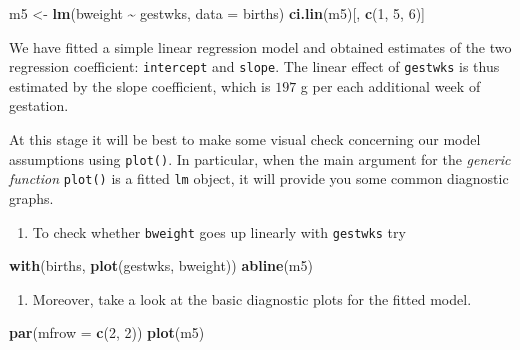 \documentclass[
]{book}
\newenvironment{Shaded}{\begin{snugshade}}{\end{snugshade}}
\newcommand{\AttributeTok}[1]{\textcolor[rgb]{0.13,0.29,0.53}{#1}}
\newcommand{\DecValTok}[1]{\textcolor[rgb]{0.00,0.00,0.81}{#1}}
\newcommand{\FunctionTok}[1]{\textcolor[rgb]{0.13,0.29,0.53}{\textbf{#1}}}
\newcommand{\NormalTok}[1]{#1}
\newcommand{\OtherTok}[1]{\textcolor[rgb]{0.56,0.35,0.01}{#1}}
\newcommand{\SpecialCharTok}[1]{\textcolor[rgb]{0.81,0.36,0.00}{\textbf{#1}}}
\providecommand{\tightlist}{%
  \setlength{\itemsep}{0pt}\setlength{\parskip}{0pt}}
\begin{document}
\begin{Shaded}
\begin{Highlighting}[]
\NormalTok{m5 }\OtherTok{\textless{}{-}} \FunctionTok{lm}\NormalTok{(bweight }\SpecialCharTok{\textasciitilde{}}\NormalTok{ gestwks, }\AttributeTok{data =}\NormalTok{ births)}
\FunctionTok{ci.lin}\NormalTok{(m5)[, }\FunctionTok{c}\NormalTok{(}\DecValTok{1}\NormalTok{, }\DecValTok{5}\NormalTok{, }\DecValTok{6}\NormalTok{)]}
\end{Highlighting}
\end{Shaded}

We have fitted a simple linear regression model and
obtained estimates of the
two regression coefficient: \texttt{intercept} and \texttt{slope}.
The linear effect of \texttt{gestwks} is thus estimated by the
slope coefficient, which is \(197\) g per each additional week of gestation.

At this stage it will be best to make some visual check concerning
our model assumptions using \texttt{plot()}. In particular, when the main argument
for the \emph{generic function} \texttt{plot()} is a fitted \texttt{lm} object,
it will provide you some common diagnostic graphs.

\begin{enumerate}
\def\labelenumi{\arabic{enumi}.}
\setcounter{enumi}{1}
\tightlist
\item
  To check whether \texttt{bweight} goes up linearly with \texttt{gestwks} try
\end{enumerate}

\begin{Shaded}
\begin{Highlighting}[]
\FunctionTok{with}\NormalTok{(births, }\FunctionTok{plot}\NormalTok{(gestwks, bweight))}
\FunctionTok{abline}\NormalTok{(m5)}
\end{Highlighting}
\end{Shaded}

\begin{enumerate}
\def\labelenumi{\arabic{enumi}.}
\setcounter{enumi}{2}
\tightlist
\item
  Moreover, take a look at the basic diagnostic plots for the fitted model.
\end{enumerate}

\begin{Shaded}
\begin{Highlighting}[]
\FunctionTok{par}\NormalTok{(}\AttributeTok{mfrow =} \FunctionTok{c}\NormalTok{(}\DecValTok{2}\NormalTok{, }\DecValTok{2}\NormalTok{))}
\FunctionTok{plot}\NormalTok{(m5)}
\end{Highlighting}
\end{Shaded}
\end{document}
